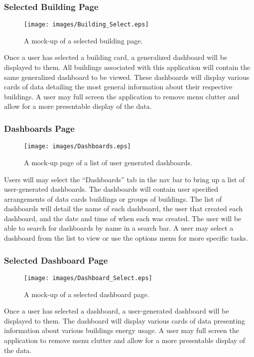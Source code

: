 \documentclass[journal,10pt,onecolumn,compsoc]{IEEEtran}
\begin{document}
    \subsubsection{Selected Building Page}
    \begin{figure}[H]
        \centering
        \texttt{[image: images/Building\_Select.eps]}
        \caption{A mock-up of a selected building page.}
    \end{figure}
	Once a user has selected a building card, a generalized dashboard will be displayed to them.
	All buildings associated with this application will contain the same generalized dashboard to be viewed.
	These dashboards will display various cards of data detailing the most general information about their respective buildings.
	A user may full screen the application to remove menu clutter and allow for a more presentable display of the data.
	
	\subsubsection{Dashboards Page}
    \begin{figure}[H]
        \centering
        \texttt{[image: images/Dashboards.eps]}
        \caption{A mock-up page of a list of user generated dashboards.}
    \end{figure}
	Users will may select the ``Dashboards'' tab in the nav bar to bring up a list of user-generated dashboards.
	The dashboards will contain user specified arrangements of data cards buildings or groups of buildings. 
	The list of dashboards will detail the name of each dashboard, the user that created each dashboard, and the date and time of when each was created.
	The user will be able to search for dashboards by name in a search bar. 
	A user may select a dashboard from the list to view or use the options menu for more specific tasks.
	
    \subsubsection{Selected Dashboard Page}
    \begin{figure}[H]
        \centering
        \texttt{[image: images/Dashboard\_Select.eps]}
        \caption{A mock-up of a selected dashboard page.}
    \end{figure}
	Once a user has selected a dashboard, a user-generated dashboard will be displayed to them.
	The dashboard will display various cards of data presenting information about various buildings energy usage.
	A user may full screen the application to remove menu clutter and allow for a more presentable display of the data.
	
\end{document}
